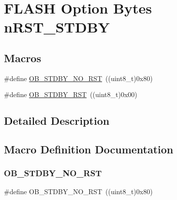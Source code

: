 \hypertarget{group___f_l_a_s_h_ex___option___bytes__n_r_s_t___s_t_d_b_y}{}\section{F\+L\+A\+SH Option Bytes n\+R\+S\+T\+\_\+\+S\+T\+D\+BY}
\label{group___f_l_a_s_h_ex___option___bytes__n_r_s_t___s_t_d_b_y}
\subsection*{Macros}
\begin{DoxyCompactItemize}
\item 
\#define \mbox{\hyperlink{group___f_l_a_s_h_ex___option___bytes__n_r_s_t___s_t_d_b_y_gad776ed7b3b9a98013aac9976eedb7e94}{O\+B\+\_\+\+S\+T\+D\+B\+Y\+\_\+\+N\+O\+\_\+\+R\+ST}}~((uint8\+\_\+t)0x80)
\item 
\#define \mbox{\hyperlink{group___f_l_a_s_h_ex___option___bytes__n_r_s_t___s_t_d_b_y_ga69451a6f69247528f58735c9c83499ce}{O\+B\+\_\+\+S\+T\+D\+B\+Y\+\_\+\+R\+ST}}~((uint8\+\_\+t)0x00)
\end{DoxyCompactItemize}


\subsection{Detailed Description}


\subsection{Macro Definition Documentation}
\mbox{\label{group___f_l_a_s_h_ex___option___bytes__n_r_s_t___s_t_d_b_y_gad776ed7b3b9a98013aac9976eedb7e94}} 
\subsubsection{\texorpdfstring{O\+B\+\_\+\+S\+T\+D\+B\+Y\+\_\+\+N\+O\+\_\+\+R\+ST}{OB\_STDBY\_NO\_RST}}
{\footnotesize\ttfamily \#define O\+B\+\_\+\+S\+T\+D\+B\+Y\+\_\+\+N\+O\+\_\+\+R\+ST~((uint8\+\_\+t)0x80)}

